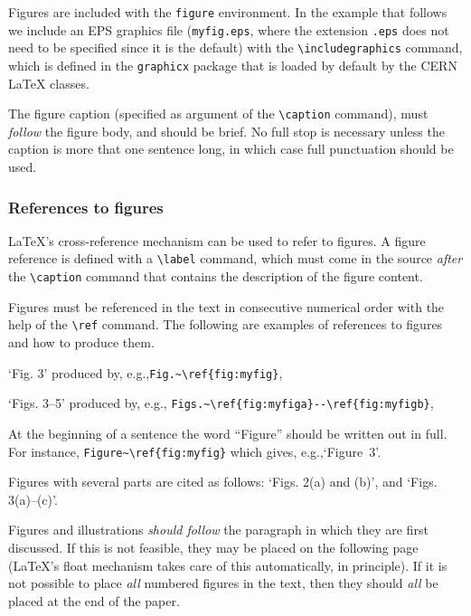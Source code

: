 \documentclass{cernphprep}
\providecommand*\eg{e.g.,\xspace}
\begin{document}
Figures are included with the \texttt{figure} environment. In the
example that follows we include an EPS graphics file
(\texttt{myfig.eps}, where the extension \texttt{.eps} does not need
to be specified since it is the default) with the
\verb!\includegraphics! command, which is defined in the
\texttt{graphicx} package that is loaded by default by the CERN
\LaTeX{} classes.

The figure caption (specified as argument of the \verb!\caption!
command), must \emph{follow} the figure body, and should be brief. No
full stop is necessary unless the caption is more that one sentence
long, in which case full punctuation should be used.

\subsubsection{References to figures}

\LaTeX's cross-reference mechanism can be used to refer to figures.  A
figure reference is defined with a \verb!\label! command, which must
come in the source \emph{after} the \verb!\caption! command that
contains the description of the figure content.

Figures must be referenced in the text in consecutive numerical order
with the help of the \verb!\ref! command. The following are examples
of references to figures and how to produce them.
\begin{Itemize}
\item `Fig. 3' produced by, \eg \verb!Fig.~\ref{fig:myfig}!,
\item `Figs. 3--5' produced by, \eg
       \verb!Figs.~\ref{fig:myfiga}--\ref{fig:myfigb}!,
\item  At the beginning of a sentence the word ``Figure'' should be
       written out in full. For instance, \verb!Figure~\ref{fig:myfig}!
       which gives, \eg `Figure~3'.
\end{Itemize}
Figures with several parts are cited as follows: `Figs. 2(a) and (b)',
and `Figs. 3(a)--(c)'.

Figures and illustrations \emph{should follow} the paragraph in which
they are first discussed.  If this is not feasible, they may be placed
on the following page (\LaTeX{}'s float mechanism takes care of this
automatically, in principle). If it is not possible to place
\emph{all} numbered figures in the text, then they should \emph{all}
be placed at the end of the paper.
\end{document}
